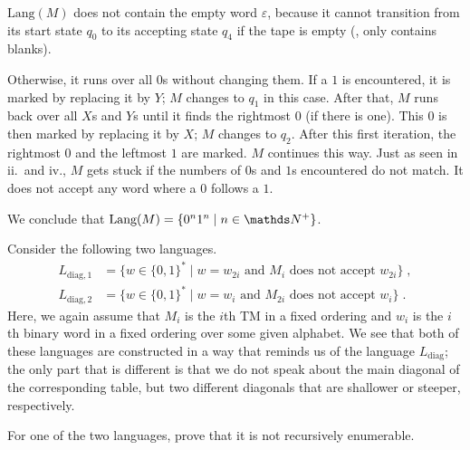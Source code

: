 \documentclass{exercise}
\begin{document}
  \begin{solution}
    $\text{Lang}(M)$ does not contain the empty word $\varepsilon$, because it cannot
		transition from its start state $q_0$ to its accepting state $q_4$ if the tape is empty (\ie, only
		contains blanks).
    
		Otherwise, it runs over all $0$s without changing them.  If a $1$ is encountered, it
		is marked by replacing it by $Y$; $M$ changes to $q_1$ in this case.  After that,
		$M$ runs back over all $X$s and $Y$s until it finds the rightmost $0$ (if there is
		one).  This $0$ is then marked by replacing it by $X$; $M$ changes to $q_2$.
		After this first iteration, the rightmost $0$ and the leftmost $1$ are marked.
		$M$ continues this way.  Just as seen in ii.\ and iv., $M$ gets stuck if the
		numbers of $0$s and $1$s encountered do not match.  It does not accept
		any word where a $0$ follows a $1$.

		We conclude that $\text{Lang}(M)=\{0^n1^n\mid n\in\nat^+\}$.
  \end{solution}


Consider the following two languages.
\begin{align*}
  L_{\text{diag},1} &= \{ w\in\{0,1\}^* \mid w = w_{2i} \text{ and } M_i \text{ does not accept } w_{2i} \}\;,\\
  L_{\text{diag},2} &= \{ w\in\{0,1\}^* \mid w = w_i \text{ and } M_{2i} \text{ does not accept } w_i \}\;.
\end{align*}
Here, we again assume that $M_i$ is the $i$th TM in a fixed ordering
and $w_i$ is the $i$th binary word in a fixed ordering over some given alphabet.
We see that both of these languages are constructed in a way that reminds us
of the language $L_{\text{diag}}$; the only part that is different is that we
do not speak about the main diagonal of the corresponding table, but two different
diagonals that are shallower or steeper, respectively.

\subtask For one of the two languages, prove that it is not recursively enumerable.
\end{document}
